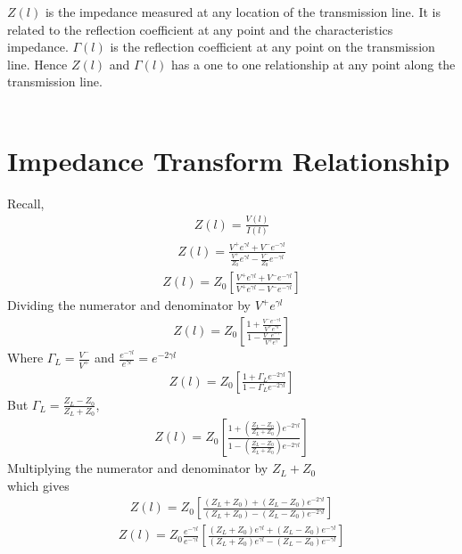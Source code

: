 $Z(l)$ is the impedance measured at any location of the transmission line. It is related to the reflection coefficient at any point and the characteristics impedance.
$\Gamma(l)$ is the reflection coefficient at any point on the transmission line.
Hence $Z(l)$ and $\Gamma(l)$ has a one to one relationship at any point along the transmission line.\\\\
\section{Impedance Transform Relationship}
Recall,
\begin{align*}
Z(l) = \frac{V(l)}{I(l)}
\end{align*}
\begin{align*}
Z(l) = \frac{V^+e^{\gamma l} + V^-e^{-\gamma l}}{\frac{V^+}{Z_0}e^{\gamma l} - \frac{V^-}{Z_0}e^{-\gamma l}}
\end{align*}
\begin{align*}
Z(l) = Z_0[\frac{V^+e^{\gamma l} + V^-e^{-\gamma l}}{V^+e^{\gamma l} - V^-e^{-\gamma l}}]
\end{align*}
Dividing  the numerator and denominator by $V^+e^{\gamma l}$ 
\begin{align*}
Z(l) = Z_0[\frac{1 + \frac{V^-e^{-\gamma l}}{V^+e^{\gamma l}}}{1 - \frac{V^-e^{-\gamma }}{V^+e^{\gamma }}}]
\end{align*}
Where $\Gamma_L = \frac{V^-}{V^+}$ and $\frac{e^{-\gamma l}}{e^{\gamma l}} = e^{-2\gamma l}$
\begin{align}
Z(l)=  Z_0[\frac{1 + \Gamma_L e^{-2\gamma l}}{1 - \Gamma_L e^{-2\gamma l}}]
\end{align}
But $\Gamma_L
= \frac{Z_L - Z_0}{Z_L + Z_0}$,
\begin{align*}
Z(l) = Z_0 [\frac{1 + (\frac{Z_L - Z_0}{Z_L + Z_0})e^{-2\gamma l}}{1 - (\frac{Z_L - Z_0}{Z_L + Z_0})e^{-2\gamma l}}]
\end{align*}
Multiplying the numerator and denominator by $Z_L + Z_0 $\\
which gives
\begin{align*}
Z(l) = Z_0 [\frac{(Z_L + Z_0) + (Z_L - Z_0)e^{-2\gamma l}}{(Z_L + Z_0) - (Z_L - Z_0)e^{-2\gamma l}}]
\end{align*}
\begin{align*}
Z(l) = Z_0 \frac{e^{-\gamma l}}{e^{-\gamma l}}[\frac{(Z_L + Z_0)e^{\gamma l} + (Z_L - Z_0)e^{-\gamma l}}{(Z_L + Z_0)e^{\gamma l} - (Z_L - Z_0)e^{-\gamma l}}]
\end{align*}
